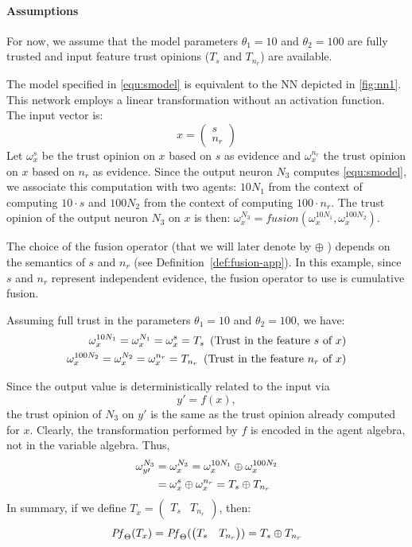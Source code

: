 \paragraph*{Assumptions} For now, we assume that the model parameters \(\theta_1=10\) and  \(\theta_2=100\) are fully trusted and input feature trust opinions (\(T_s\) and \(T_{n_r}\)) are available.

The model specified in \cref{equ:smodel} is equivalent to the NN depicted in \cref{fig:nn1}. This network employs a linear transformation without an activation function. The input vector is:
$$ 
x = \begin{pmatrix}
    s \\
    n_r
\end{pmatrix}
$$ 
Let $\omega_x^s$ be the trust opinion on $x$ based on $s$ as evidence and  $\omega_x^{n_r}$ the trust opinion on $x$ based on $n_r$ as evidence. Since the output neuron $N_3$ computes \cref{equ:smodel}, we associate this computation with two agents: $10N_1$ from the context of computing \(10\cdot s\) and $100N_2$ from the context of computing \(100\cdot n_r\). The trust opinion of the output neuron \(N_3\) on \(x\) is then: 
\(\omega_x^{N_3} = \mathit{fusion}(\omega_x^{10N_1}, \omega_x^{100N_2})\). 

The choice of the fusion operator (that we will later denote by \(\oplus\) ) depends on the semantics of \(s\) and \(n_r\) (see Definition~\ref{def:fusion-app}). In this example, since $s$ and $n_r$ represent independent evidence, the fusion operator to use is cumulative fusion.

Assuming full trust in the parameters \(\theta_1 = 10\) and \(\theta_2 = 100\), we have:
\begin{align}
    \omega_x^{10N_1} = \omega_x^{N_1} = \omega_x^{s} = T_s \, \text{ (Trust in the feature \(s\) of \(x\))} \notag \\
    \omega_x^{100N_2} = \omega_x^{N_2} = \omega_x^{n_r} = T_{n_r} \, \text{ (Trust in the feature \(n_r\) of \(x\))} \notag 
\end{align}

Since the output value is deterministically related to the input via
\[
y' = f(x),
\]
the trust opinion of \(N_3\) on \(y'\) is the same as the trust opinion already computed for \(x\). Clearly, the transformation performed by \(f\) is encoded in the agent algebra, not in the variable algebra. Thus,
\begin{align}
    \omega_{y\prime}^{N_3} &= \omega_x^{N_3} = \omega_x^{10N_1} \oplus \omega_x^{100N_2} \notag \notag \\
&= \omega_x^{s} \oplus \omega_x^{n_r} = T_s \oplus T_{n_r}
\end{align}
In summary, if we define \(T_x = \begin{pmatrix}
    T_s&T_{n_r}
\end{pmatrix} \), then:
\[\mathit{Pf}_\Theta(T_x) = \mathit{Pf}_\Theta(\begin{pmatrix}
    T_s&T_{n_r}
\end{pmatrix}) =  T_s \oplus T_{n_r} \]


